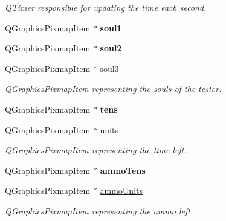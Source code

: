 \begin{DoxyCompactItemize}
\begin{DoxyCompactList}\small\item\em Q\-Timer responsible for updating the time each second. \end{DoxyCompactList}\item 
\hypertarget{classGame2Scene_a074f24b08fdd45db045bfd42a031a0bb}{Q\-Graphics\-Pixmap\-Item $\ast$ {\bfseries soul1}}\label{classGame2Scene_a074f24b08fdd45db045bfd42a031a0bb}

\item 
\hypertarget{classGame2Scene_a530af7b1147f2a7e960d62e086fa338c}{Q\-Graphics\-Pixmap\-Item $\ast$ {\bfseries soul2}}\label{classGame2Scene_a530af7b1147f2a7e960d62e086fa338c}

\item 
\hypertarget{classGame2Scene_addfdb5c43738ff25d5e4e385c8c1f18a}{Q\-Graphics\-Pixmap\-Item $\ast$ \hyperlink{classGame2Scene_addfdb5c43738ff25d5e4e385c8c1f18a}{soul3}}\label{classGame2Scene_addfdb5c43738ff25d5e4e385c8c1f18a}

\begin{DoxyCompactList}\small\item\em Q\-Graphics\-Pixmap\-Item representing the souls of the tester. \end{DoxyCompactList}\item 
\hypertarget{classGame2Scene_a2925920230b9269693709cd31e74beac}{Q\-Graphics\-Pixmap\-Item $\ast$ {\bfseries tens}}\label{classGame2Scene_a2925920230b9269693709cd31e74beac}

\item 
\hypertarget{classGame2Scene_af6b9f0c6a56d106c07a0d68ed3a7fb44}{Q\-Graphics\-Pixmap\-Item $\ast$ \hyperlink{classGame2Scene_af6b9f0c6a56d106c07a0d68ed3a7fb44}{units}}\label{classGame2Scene_af6b9f0c6a56d106c07a0d68ed3a7fb44}

\begin{DoxyCompactList}\small\item\em Q\-Graphics\-Pixmap\-Item representing the time left. \end{DoxyCompactList}\item 
\hypertarget{classGame2Scene_adcaf22f9ed4165aa5eb99eedb72445b5}{Q\-Graphics\-Pixmap\-Item $\ast$ {\bfseries ammo\-Tens}}\label{classGame2Scene_adcaf22f9ed4165aa5eb99eedb72445b5}

\item 
\hypertarget{classGame2Scene_a228893ef05a54bc3d67f4ec0b46d2198}{Q\-Graphics\-Pixmap\-Item $\ast$ \hyperlink{classGame2Scene_a228893ef05a54bc3d67f4ec0b46d2198}{ammo\-Units}}\label{classGame2Scene_a228893ef05a54bc3d67f4ec0b46d2198}

\begin{DoxyCompactList}\small\item\em Q\-Graphics\-Pixmap\-Item representing the ammo left. \end{DoxyCompactList}\end{DoxyCompactItemize}


